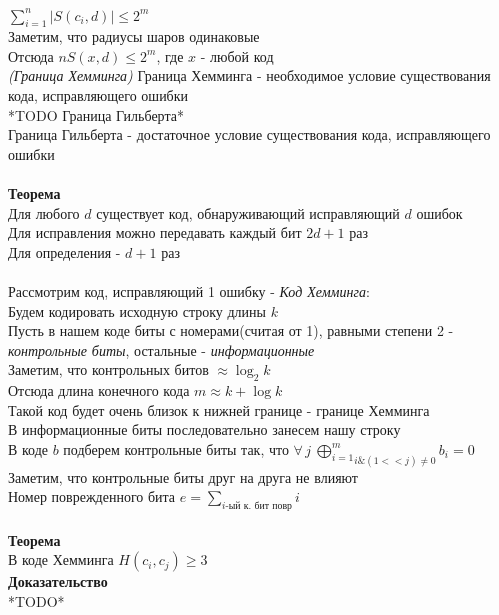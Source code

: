 \documentclass[12pt]{article}
\begin{document}
$\sum_{i=1}^n |S(c_i, d)| \leq 2^m$\\
Заметим, что радиусы шаров одинаковые\\
Отсюда $nS(x,d) \leq 2^m$, где $x$ - любой код\\
\textit{(Граница Хемминга)}
Граница Хемминга - необходимое условие существования кода, исправляющего ошибки\\
*TODO Граница Гильберта*\\
Граница Гильберта - достаточное условие существования кода, исправляющего ошибки\\\\
\textbf{Теорема}\\
Для любого $d$ существует код, обнаруживающий исправляющий $d$ ошибок\\
Для исправления можно передавать каждый бит $2d+1$ раз\\
Для определения - $d+1$ раз\\\\
Рассмотрим код, исправляющий 1 ошибку - \textit{Код Хемминга}:\\
Будем кодировать исходную строку длины $k$\\
Пусть в нашем коде биты с номерами(считая от 1), равными степени 2 - \textit{контрольные биты}, остальные - \textit{информационные}\\
Заметим, что контрольных битов $\approx \log_2 k$\\
Отсюда длина конечного кода $m \approx k+\log k$\\
Такой код будет очень близок к нижней границе - границе Хемминга\\
В информационные биты последовательно занесем нашу строку\\
В коде $b$ подберем контрольные биты так, что $\forall\,j\ \underset{i \& (1<<j) \neq 0}{\bigoplus_{i=1}^m} b_i = 0$\\
Заметим, что контрольные биты друг на друга не влияют\\
Номер поврежденного бита $e = \sum_{i\text{-ый к. бит повр}} i$\\\\
\textbf{Теорема}\\
В коде Хемминга $H(c_i, c_j) \geq 3$\\
\textbf{Доказательство}\\
*TODO*
\end{document}
